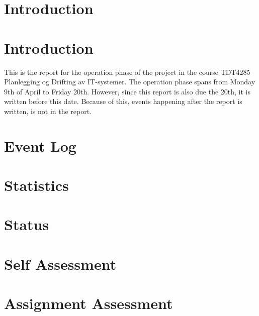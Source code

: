 \documentclass[12pt]{article}
\begin{document}

\tableofcontents
\section{Introduction}


\section{Introduction}
This is the report for the operation phase of the project in the course TDT4285 Planlegging og Drifting av IT-systemer. The operation phase spans from Monday 9th of April to Friday 20th. However, since this report is also due the 20th, it is written before this date. Because of this, events happening after the report is written, is not in the report. 



\section{Event Log}



\section{Statistics}



\section{Status}



\section{Self Assessment}



\section{Assignment Assessment}



\end{document}
